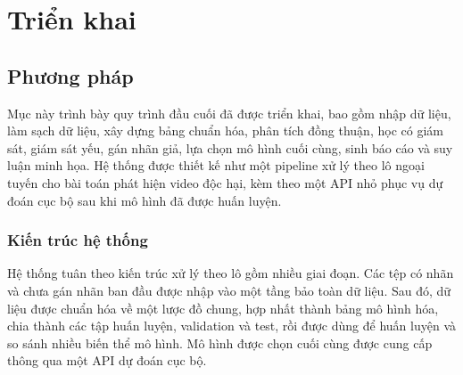 \section{Triển khai}

\subsection{Phương pháp}

Mục này trình bày quy trình đầu cuối đã được triển khai, bao gồm nhập dữ liệu, làm sạch dữ liệu, xây dựng bảng chuẩn hóa, phân tích đồng thuận, học có giám sát, giám sát yếu, gán nhãn giả, lựa chọn mô hình cuối cùng, sinh báo cáo và suy luận minh họa. Hệ thống được thiết kế như một pipeline xử lý theo lô ngoại tuyến cho bài toán phát hiện video độc hại, kèm theo một API nhỏ phục vụ dự đoán cục bộ sau khi mô hình đã được huấn luyện.

\subsubsection{Kiến trúc hệ thống}

Hệ thống tuân theo kiến trúc xử lý theo lô gồm nhiều giai đoạn. Các tệp có nhãn và chưa gán nhãn ban đầu được nhập vào một tầng bảo toàn dữ liệu. Sau đó, dữ liệu được chuẩn hóa về một lược đồ chung, hợp nhất thành bảng mô hình hóa, chia thành các tập huấn luyện, validation và test, rồi được dùng để huấn luyện và so sánh nhiều biến thể mô hình. Mô hình được chọn cuối cùng được cung cấp thông qua một API dự đoán cục bộ.


